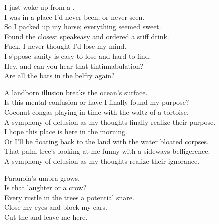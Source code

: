 
\label{album:phantom-island}





I just woke up from a . \\
I was in a place I'd never been, or never seen. \\
So I packed up my horse; everything seemed sweet. \\
Found the closest speakeasy and ordered a stiff drink. \\

Fuck, I never thought I'd lose my mind. \\
I s'ppose sanity is easy to lose and hard to find. \\
Hey, and can you hear that tintinnabulation? \\
Are all the bats in the belfry again? \\


A landborn illusion breaks the ocean's surface. \\
Is this mental confusion or have I finally found my purpose? \\
Coconut congas playing in time with the waltz of a tortoise. \\
A symphony of delusion as my thoughts finally realize their purpose. \\

I hope this place is here in the morning. \\
Or I'll be floating back to the land with the water bloated corpses. \\
That palm tree's looking at me funny with a sideways belligerence. \\
A symphony of delusion as my thoughts realize their ignorance. \\


Paranoia's umbra grows. \\
Is that laughter or a crow? \\
Every rustle in the trees a potential snare. \\
Close my eyes and block my ears. \\
Cut the  and leave me here. \\


